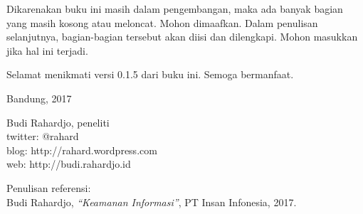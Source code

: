 Dikarenakan buku ini masih dalam pengembangan, maka ada banyak bagian yang
masih kosong atau meloncat. Mohon dimaafkan. Dalam penulisan selanjutnya,
bagian-bagian tersebut akan diisi dan dilengkapi. Mohon masukkan jika hal ini
terjadi.

Selamat menikmati versi 0.1.5 dari buku ini. Semoga bermanfaat.
\vspace{5 mm}

Bandung, 2017


Budi Rahardjo, peneliti\\
twitter: @rahard\\
blog: http://rahard.wordpress.com\\
web: http://budi.rahardjo.id

\vspace{5 mm}
Penulisan referensi:\\
Budi Rahardjo, {\em ``Keamanan Informasi''}, PT Insan Infonesia, 2017.

\doclicenseThis
